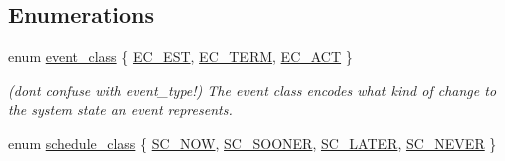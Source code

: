 \subsection*{Enumerations}
\begin{DoxyCompactItemize}
\item 
enum \hyperlink{namespacetricl_a6967089e2c0837f273d8cb5fd9f7e46d}{event\+\_\+class} \{ \hyperlink{namespacetricl_a6967089e2c0837f273d8cb5fd9f7e46da928305067790de15396de8fcc92b72b9}{E\+C\+\_\+\+E\+ST}, 
\hyperlink{namespacetricl_a6967089e2c0837f273d8cb5fd9f7e46da16f53be37a75a1cdfc726014c7f3810a}{E\+C\+\_\+\+T\+E\+RM}, 
\hyperlink{namespacetricl_a6967089e2c0837f273d8cb5fd9f7e46dac508c68c92ee059322cb644dd330bbcf}{E\+C\+\_\+\+A\+CT}
 \}\begin{DoxyCompactList}\small\item\em (don\textquotesingle{}t confuse with event\+\_\+type!) The event class encodes what kind of change to the system state an event represents. \end{DoxyCompactList}
\item 
enum \hyperlink{namespacetricl_a2d47d7069cd7cc5daa413ded7ebd8206}{schedule\+\_\+class} \{ \hyperlink{namespacetricl_a2d47d7069cd7cc5daa413ded7ebd8206aa25b53f821bd7e3b075947c03418dc08}{S\+C\+\_\+\+N\+OW}, 
\hyperlink{namespacetricl_a2d47d7069cd7cc5daa413ded7ebd8206a66ea007cb2ea559e1c1a3c2eb903b4d5}{S\+C\+\_\+\+S\+O\+O\+N\+ER}, 
\hyperlink{namespacetricl_a2d47d7069cd7cc5daa413ded7ebd8206a36dfcabe451fb0ef7ca51b810f5c5c86}{S\+C\+\_\+\+L\+A\+T\+ER}, 
\hyperlink{namespacetricl_a2d47d7069cd7cc5daa413ded7ebd8206a5614eaeed7759691a1a30799d7bcd2f4}{S\+C\+\_\+\+N\+E\+V\+ER}
 \}
\end{DoxyCompactItemize}

